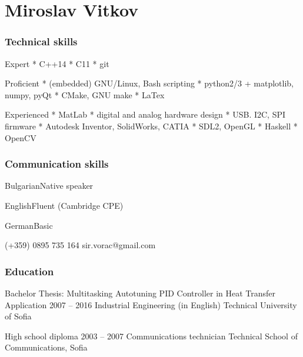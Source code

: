\documentclass{tccv}
\begin{document}
\part{Miroslav Vitkov}


\section{Technical skills}
\begin{factlist}
\item{Expert}
{
     * C++14 \mynext
     * C11   \mynext
     * git
}
\\
\item{Proficient}
{
    * (embedded) GNU/Linux, Bash scripting    \mynext
    * python2/3 + matplotlib, numpy, pyQt     \mynext
    * CMake, GNU make                         \mynext
    * LaTex
}
\\
\item{Experienced}
{
    * MatLab                                       \mynext
    * digital and analog hardware design           \mynext
    * USB. I2C, SPI firmware                       \mynext
    * Autodesk Inventor, SolidWorks, CATIA         \mynext
    * SDL2, OpenGL                                 \mynext
    * Haskell                                      \mynext
    * OpenCV
}
\end{factlist}


\section{Communication skills}
\begin{factlist}
\item{Bulgarian}{Native speaker}
\item{English}{Fluent (Cambridge CPE)}
\item{German}{Basic}
\end{factlist}


\personal
    {}
    {(+359) 0895 735 164}
    {sir.vorac@gmail.com}


\section{Education}
\begin{yearlist}
\item[Bachelor Thesis:                 \newline
     {\footnotesize Multitasking Autotuning PID Controller in Heat Transfer Application}]
     {2007 -- 2016}
     {Industrial Engineering (in English)}
     {Technical University of Sofia}

\item[High school diploma]{2003 -- 2007}
     {Communications technician}
     {Technical School of Communications, Sofia}
\end{yearlist}
\end{document}
